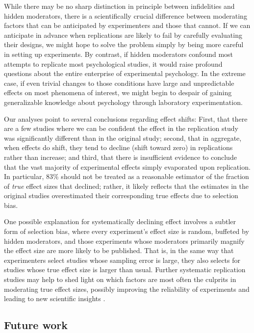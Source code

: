 \documentclass[aoas, preprint]{imsart}
\theoremstyle{definition}
\theoremstyle{custom}
\begin{document}
  While there may be no sharp distinction in principle between infidelities and hidden moderators, there is a scientifically crucial difference between moderating factors that can be anticipated by experimenters and those that cannot. If we can anticipate in advance when replications are likely to fail by carefully evaluating their designs, we might hope to solve the problem simply by being more careful in setting up experiments. By contrast, if hidden moderators confound most attempts to replicate most psychological studies, it would raise profound questions about the entire enterprise of experimental psychology. In the extreme case, if even trivial changes to those conditions have large and unpredictable effects on most phenomena of interest, we might begin to despair of gaining generalizable knowledge about psychology through laboratory experimentation. 

  Our analyses point to several conclusions regarding effect shifts: First, that there are a few studies where we can be confident the effect in the replication study was significantly different than in the original study; second, that in aggregate, when effects do shift, they tend to decline (shift toward zero) in replications rather than increase; and third, that there is insufficient evidence to conclude that the vast majority of experimental effects simply evaporated upon replication. In particular, 83\% should not be treated as a reasonable estimator of the fraction of {\em true} effect sizes that declined; rather, it likely reflects that the estimates in the original studies overestimated their corresponding true effects due to selection bias.

  One possible explanation for systematically declining effect involves a subtler form of selection bias, where every experiment's effect size is random, buffeted by hidden moderators, and those experiments whose moderators primarily magnify the effect size are more likely to be published. That is, in the same way that experimenters select studies whose sampling error is large, they also selects for studies whose true effect size is larger than usual. Further systematic replication studies may help to shed light on which factors are most often the culprits in moderating true effect sizes, possibly improving the reliability of experiments and leading to new scientific insights \citep{Barrett:2015vl,Klein:2018}.

\subsection{Future work}
\end{document}

